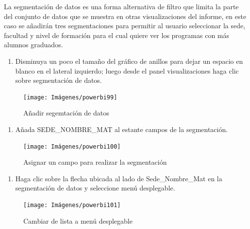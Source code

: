 \documentclass[
]{book}
\providecommand{\tightlist}{%
  \setlength{\itemsep}{0pt}\setlength{\parskip}{0pt}}
\begin{document}
La segmentación de datos es una forma alternativa de filtro que limita la parte del conjunto de datos que se muestra en otras visualizaciones del informe, en este caso se añadirán tres segmentaciones para permitir al usuario seleccionar la sede, facultad y nivel de formación para el cual quiere ver los programas con más alumnos graduados.

\begin{enumerate}
\def\labelenumi{\arabic{enumi}.}
\tightlist
\item
  Disminuya un poco el tamaño del gráfico de anillos para dejar un espacio en blanco en el lateral izquierdo; luego desde el panel visualizaciones haga clic sobre segmentación de datos.
\end{enumerate}

\begin{figure}

{\centering \texttt{[image: Imágenes/powerbi99]} 

}

\caption{Añadir segemtación de datos}\label{fig:paso1segmentacion-fig}
\end{figure}

\begin{enumerate}
\def\labelenumi{\arabic{enumi}.}
\setcounter{enumi}{1}
\tightlist
\item
  Añada SEDE\_NOMBRE\_MAT al estante campos de la segmentación.
\end{enumerate}

\begin{figure}

{\centering \texttt{[image: Imágenes/powerbi100]} 

}

\caption{Asignar un campo para realizar la segmentación}\label{fig:paso2segmentacion-fig}
\end{figure}

\begin{enumerate}
\def\labelenumi{\arabic{enumi}.}
\setcounter{enumi}{2}
\tightlist
\item
  Haga clic sobre la flecha ubicada al lado de Sede\_Nombre\_Mat en la segmentación de datos y seleccione menú desplegable.
\end{enumerate}

\begin{figure}

{\centering \texttt{[image: Imágenes/powerbi101]} 

}

\caption{Cambiar de lista a menú desplegable}\label{fig:paso3segmentacion-fig}
\end{figure}
\end{document}
